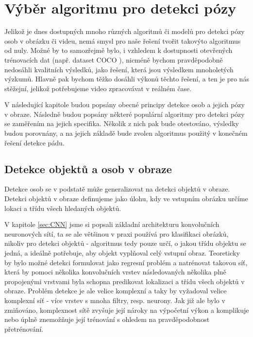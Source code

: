 \chapter{Výběr algoritmu pro detekci pózy}
\label{sec:Pose}

Jelikož je dnes dostupných mnoho různých algoritmů či modelů pro detekci pózy
osob v obrázku či videu, nemá smysl pro naše řešení tvořit takovýto algoritmus
od nuly. Možné by to samozřejmě bylo, i vzhledem k dostupnosti otevřených
trénovacích dat (např. dataset COCO \cite{coco}), nicméně bychom pravděpodobně
nedosáhli kvalitních výsledků, jako řešení, která jsou výsledkem mnoholetých
výzkumů. Hlavně pak bychom těžko dosáhli výkonů těchto řešení, a ten je pro nás
stěžejní, jelikož potřebujeme video zpracovávat v reálném čase.

V následující kapitole budou popsány obecné principy detekce osob a jejich pózy
v obraze. Následně budou popsány některé populární algoritmy pro detekci pózy
se zaměřením na jejich specifika. Několik z nich pak bude otestováno, výsledky
budou porovnány, a na jejich základě bude zvolen algoritmus použitý v konečném
řešení detekce pádu.

\section{Detekce objektů a osob v obraze}

Detekce osob se v podstatě může generalizovat na detekci objektů v obraze.
Detekci objektů v obraze definujeme jako úlohu, kdy ve vstupním obrázku určíme
lokaci a třídu všech hledaných objektů.

V kapitole \ref{sec:CNN} jsme si popsali základní architekturu konvolučních
neuronových sítí, ta se ale většinou v praxi používá pro klasifikaci obrázků,
nikoliv pro detekci objektů - algoritmus tedy pouze určí, o jakou třídu objektu
se jedná, a ideálně potřebuje, aby objekt vyplňoval celý vstupní obraz.
Teoreticky by bylo možné detekci formulovat jako regresní problém a natrénovat
takovou síť, která by pomoci několika konvolučních vrstev následovaných
několika plně propojenými vrstvami byla schopna predikovat lokalizaci a třídu
všech objektů v obraze. \cite{szegedy} Problém detekce je ale velice komplexní
a taky by vyžadoval velice komplexní síť - více vrstev s mnoha filtry, resp.
neurony. Jak již ale bylo v zmiňováno, komplexnost sítě zvyšuje její nároky na
výpočetní výkon a komplikuje nebo úplně znemožňuje její trénování s ohledem na
pravděpodobnost přetrénování.

